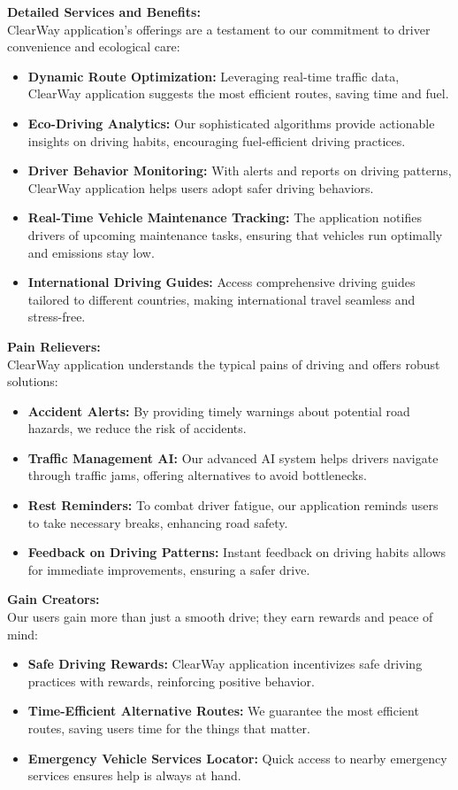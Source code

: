 \documentclass[12pt,a4paper]{article}
\begin{document}
\noindent \textbf{Detailed Services and Benefits: }\\
\noindent ClearWay application’s offerings are a testament to our commitment to driver convenience and ecological care:
\begin{itemize}
    \item \textbf{Dynamic Route Optimization:} Leveraging real-time traffic data, ClearWay application suggests the most efficient routes, saving time and fuel.
    \item \textbf{Eco-Driving Analytics:} Our sophisticated algorithms provide actionable insights on driving habits, encouraging fuel-efficient driving practices.
    \item \textbf{Driver Behavior Monitoring:} With alerts and reports on driving patterns, ClearWay application helps users adopt safer driving behaviors.
    \item \textbf{Real-Time Vehicle Maintenance Tracking:} The application notifies drivers of upcoming maintenance tasks, ensuring that vehicles run optimally and emissions stay low.
    \item \textbf{International Driving Guides:} Access comprehensive driving guides tailored to different countries, making international travel seamless and stress-free.
\end{itemize}

\noindent \textbf{Pain Relievers:} \\
\noindent ClearWay application understands the typical pains of driving and offers robust solutions:
\begin{itemize}
    \item \textbf{Accident Alerts:} By providing timely warnings about potential road hazards, we reduce the risk of accidents.
    \item \textbf{Traffic Management AI:} Our advanced AI system helps drivers navigate through traffic jams, offering alternatives to avoid bottlenecks.
    \item \textbf{Rest Reminders:} To combat driver fatigue, our application reminds users to take necessary breaks, enhancing road safety.
    \item \textbf{Feedback on Driving Patterns:} Instant feedback on driving habits allows for immediate improvements, ensuring a safer drive.
\end{itemize}

\noindent \textbf{Gain Creators:} \\
\noindent Our users gain more than just a smooth drive; they earn rewards and peace of mind:
\begin{itemize}
    \item \textbf{Safe Driving Rewards:} ClearWay application incentivizes safe driving practices with rewards, reinforcing positive behavior.
    \item \textbf{Time-Efficient Alternative Routes:} We guarantee the most efficient routes, saving users time for the things that matter.
    \item \textbf{Emergency Vehicle Services Locator:} Quick access to nearby emergency services ensures help is always at hand.
\end{itemize}
\end{document}
